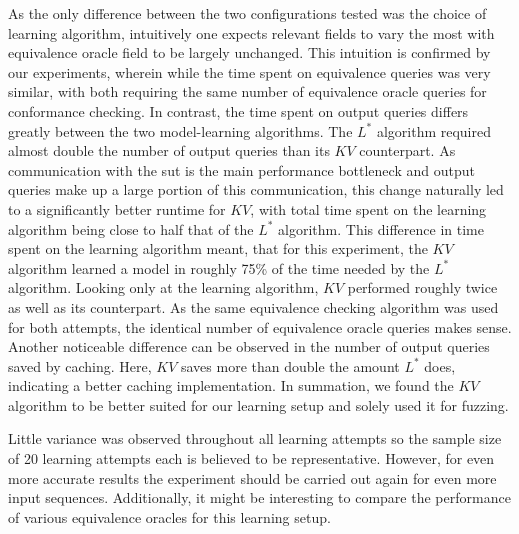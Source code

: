 As the only difference between the two configurations tested was the choice of learning algorithm, intuitively one expects relevant fields to vary the most with equivalence oracle field to be largely unchanged. This intuition is confirmed by our experiments, wherein while the time spent on equivalence queries was very similar, with both requiring the same number of equivalence oracle queries for conformance checking. In contrast, the time spent on output queries differs greatly between the two model-learning algorithms. The $L^*$ algorithm required almost double the number of output queries than its $KV$ counterpart. As communication with the \ac{sut} is the main performance bottleneck and output queries make up a large portion of this communication, this change naturally led to a significantly better runtime for $KV$, with total time spent on the learning algorithm being close to half that of the $L^*$ algorithm. This difference in time spent on the learning algorithm meant, that for this experiment, the $KV$ algorithm learned a model in roughly 75\% of the time needed by the $L^*$ algorithm. Looking only at the learning algorithm, $KV$ performed roughly twice as well as its counterpart. As the same equivalence checking algorithm was used for both attempts, the identical number of equivalence oracle queries makes sense. Another noticeable difference can be observed in the number of output queries saved by caching. Here, $KV$ saves more than double the amount $L^*$ does, indicating a better caching implementation. In summation, we found the $KV$ algorithm to be better suited for our learning setup and solely used it for fuzzing. 

Little variance was observed throughout all learning attempts so the sample size of 20 learning attempts each is believed to be representative. However, for even more accurate results the experiment should be carried out again for even more input sequences. Additionally, it might be interesting to compare the performance of various equivalence oracles for this learning setup.

